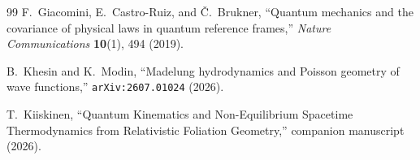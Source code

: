 \documentclass[11pt, a4paper]{article}
\theoremstyle{definition}
\begin{document}
\begin{thebibliography}{99}
F.~Giacomini, E.~Castro-Ruiz, and \v{C}.~Brukner, ``Quantum mechanics and the covariance of physical laws in quantum reference frames,'' \textit{Nature Communications} \textbf{10}(1), 494 (2019).

B.~Khesin and K.~Modin, ``Madelung hydrodynamics and Poisson geometry of wave functions,'' \texttt{arXiv:2607.01024} (2026).

T.~Kiiskinen, ``Quantum Kinematics and Non-Equilibrium Spacetime Thermodynamics from Relativistic Foliation Geometry,'' companion manuscript (2026).

\end{thebibliography}
\end{document}
